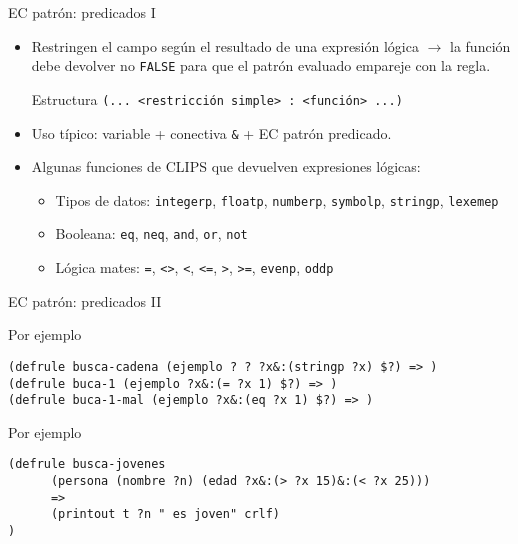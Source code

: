 \documentclass[usenames,dvipsnames,aspectratio=169]{beamer}
\begin{document}
\begin{frame}{EC patrón: predicados I}
	\begin{itemize}
		\item Restringen el campo según el resultado de una expresión lógica $\rightarrow$ la función debe devolver no \texttt{FALSE} para que el patrón evaluado empareje con la regla.
		\begin{block}{Estructura}
			\texttt{(... <restricción simple> : <función> ...)}
		\end{block}
		\item Uso típico: variable + conectiva \texttt{\&} + EC patrón predicado.
		\item Algunas funciones de CLIPS que devuelven expresiones lógicas:
		\begin{itemize}
			\item Tipos de datos: \texttt{integerp}, \texttt{floatp}, \texttt{numberp}, \texttt{symbolp}, \texttt{stringp}, \texttt{lexemep}
			\item Booleana: \texttt{eq}, \texttt{neq}, \texttt{and}, \texttt{or}, \texttt{not}
			\item Lógica mates: \texttt{=}, \texttt{<>}, \texttt{<}, \texttt{<=}, \texttt{>}, \texttt{>=}, \texttt{evenp}, \texttt{oddp}
		\end{itemize}
	\end{itemize}
\end{frame}

\begin{frame}[fragile]{EC patrón: predicados II}
	\footnotesize
	\begin{exampleblock}{Por ejemplo}
		\begin{verbatim}
(defrule busca-cadena (ejemplo ? ? ?x&:(stringp ?x) $?) => )
(defrule buca-1 (ejemplo ?x&:(= ?x 1) $?) => )
(defrule buca-1-mal (ejemplo ?x&:(eq ?x 1) $?) => )
		\end{verbatim}
	\end{exampleblock}
	\begin{exampleblock}{Por ejemplo}
		\begin{verbatim}
(defrule busca-jovenes
      (persona (nombre ?n) (edad ?x&:(> ?x 15)&:(< ?x 25)))
      =>
      (printout t ?n " es joven" crlf)
)
		\end{verbatim}
	\end{exampleblock}
\end{frame}
\end{document}

